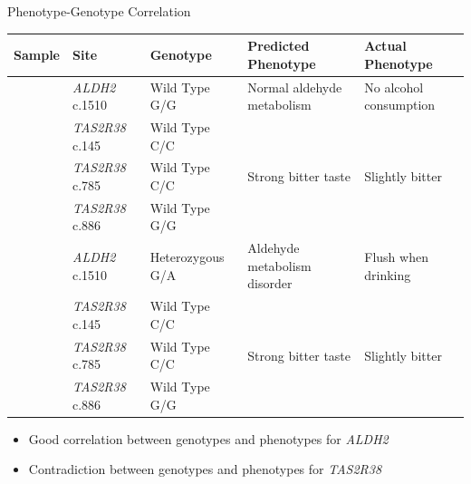 \documentclass[10pt,hyperref={colorlinks,citecolor=blue,urlcolor=peking_blue,linkcolor=}]{beamer}
\theoremstyle{plain}
\begin{document}
\begin{frame}{Phenotype-Genotype Correlation}    
    \begin{table}[H]
    \scriptsize
    \centering
        \begin{tabular}{>{\raggedright\arraybackslash}p{0.7cm}>{\raggedright\arraybackslash}p{1.7cm}>{\raggedright\arraybackslash}p{1.6cm}>{\raggedright\arraybackslash}p{2.4cm}>{\raggedright\arraybackslash}p{2cm}}
            \toprule
            \textbf{Sample} & \textbf{Site} & \textbf{Genotype} & \textbf{Predicted Phenotype} & \textbf{Actual Phenotype}\\
            \midrule
            
            \multirow{4}{*}{\makecell[l]{Han}} 
            & \textit{ALDH2} c.1510 & Wild Type G/G & Normal aldehyde metabolism & No alcohol consumption \\
            \cmidrule(lr){2-5} %
            & \textit{TAS2R38} c.145 & Wild Type C/C & &  \\
            & \textit{TAS2R38} c.785 & Wild Type C/C & Strong bitter taste & Slightly bitter \\
            & \textit{TAS2R38} c.886 & Wild Type G/G & &  \\
            
            \midrule

            \multirow{4}{*}{\makecell[l]{Feng}} 
            & \textit{ALDH2} c.1510 & Heterozygous G/A & Aldehyde metabolism disorder & Flush when drinking \\
            \cmidrule(lr){2-5} %
            & \textit{TAS2R38} c.145 & Wild Type C/C & &  \\
            & \textit{TAS2R38} c.785 & Wild Type C/C & Strong bitter taste & Slightly bitter \\
            & \textit{TAS2R38} c.886 & Wild Type G/G & &  \\
            \bottomrule
        \end{tabular}
    \end{table}
    \vspace{0.5cm}
    \begin{itemize}
        \item Good correlation between genotypes and phenotypes for \textit{ALDH2}
        \item Contradiction between genotypes and phenotypes for \textit{TAS2R38}
    \end{itemize}
\end{frame}
\end{document}
